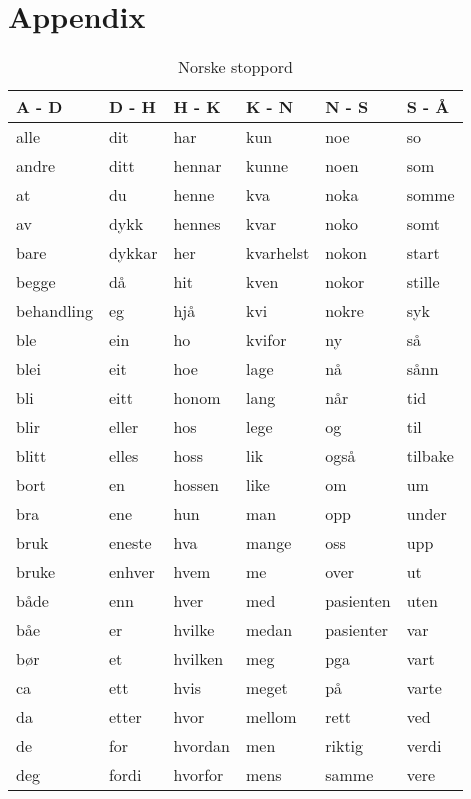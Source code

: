 \section{Appendix}
\label{sec:appendix}

\begin{table}[htbp] \footnotesize \center
\caption{Norske stoppord\label{tab:stopwords}}

\begin{tabular}{l l l l l l}

    \toprule
    A - D & D - H & H - K & K - N & N - S & S - Å \\
    \midrule
    alle & dit & har & kun & noe & so \\
    andre & ditt & hennar & kunne & noen & som \\
    at & du & henne & kva & noka & somme \\
    av & dykk & hennes & kvar & noko & somt \\
    bare & dykkar & her & kvarhelst & nokon & start \\
    begge & då & hit & kven & nokor & stille \\
    behandling & eg & hjå & kvi & nokre & syk \\
    ble & ein & ho & kvifor & ny & så \\
    blei & eit & hoe & lage & nå & sånn \\
    bli & eitt & honom & lang & når & tid \\
    blir & eller & hos & lege & og & til \\
    blitt & elles & hoss & lik & også & tilbake \\
    bort & en & hossen & like & om & um \\
    bra & ene & hun & man & opp & under \\
    bruk & eneste & hva & mange & oss & upp \\
    bruke & enhver & hvem & me & over & ut \\
    både & enn & hver & med & pasienten & uten \\
    båe & er & hvilke & medan & pasienter & var \\
    bør & et & hvilken & meg & pga & vart \\
    ca & ett & hvis & meget & på & varte \\
    da & etter & hvor & mellom & rett & ved \\
    de & for & hvordan & men & riktig & verdi \\
    deg & fordi & hvorfor & mens & samme & vere \\

\end{tabular}
\end{table}
